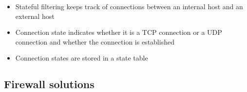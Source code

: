 \documentclass{article}
\begin{document}
\begin{itemize}
\begin{itemize}
\begin{itemize}
\begin{itemize}
\begin{enumerate}
                \end{enumerate}
              \item Stateful filtering keeps track of connections between an internal host and an external host
              \item Connection state indicates whether it is a TCP connection or a UDP connection and whether the connection is established
              \item Connection states are stored in a state table
            \end{itemize}
        \end{itemize}
    \end{itemize}
\end{itemize}
            
\subsection{Firewall solutions}
\end{document}
